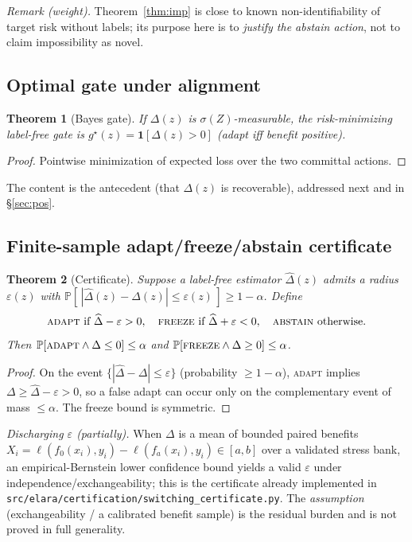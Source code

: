 \documentclass[11pt]{article}
\theoremstyle{plain}
\newtheorem{theorem}{Theorem}
\theoremstyle{definition}
\renewcommand{\Pr}{\mathbb{P}}
\begin{document}
\noindent\emph{Remark (weight).} Theorem~\ref{thm:imp} is close to known
non-identifiability of target risk without labels; its purpose here is to
\emph{justify the abstain action}, not to claim impossibility as novel.

\subsection{Optimal gate under alignment}
\begin{theorem}[Bayes gate]\label{thm:gate}
If $\Delta(z)$ is $\sigma(Z)$-measurable, the risk-minimizing label-free gate is
$g^\star(z)=\mathbf 1[\Delta(z)>0]$ (adapt iff benefit positive).
\end{theorem}
\begin{proof}
Pointwise minimization of expected loss over the two committal actions. \qedhere
\end{proof}
\noindent The content is the antecedent (that $\Delta(z)$ is recoverable), addressed
next and in \S\ref{sec:pos}.

\subsection{Finite-sample adapt/freeze/abstain certificate}\label{sec:cert}
\begin{theorem}[Certificate]\label{thm:cert}
Suppose a label-free estimator $\widehat\Delta(z)$ admits a radius $\varepsilon(z)$ with
$\Pr[\,|\widehat\Delta(z)-\Delta(z)|\le \varepsilon(z)\,]\ge 1-\alpha$. Define
\[
\textsc{adapt}\ \text{if}\ \widehat\Delta-\varepsilon>0,\quad
\textsc{freeze}\ \text{if}\ \widehat\Delta+\varepsilon<0,\quad
\textsc{abstain}\ \text{otherwise.}
\]
Then $\Pr[\textsc{adapt}\wedge \Delta\le 0]\le\alpha$ and
$\Pr[\textsc{freeze}\wedge \Delta\ge 0]\le\alpha$.
\end{theorem}
\begin{proof}
On the event $\{|\widehat\Delta-\Delta|\le\varepsilon\}$ (probability $\ge1-\alpha$),
\textsc{adapt} implies $\Delta\ge\widehat\Delta-\varepsilon>0$, so a false adapt can
occur only on the complementary event of mass $\le\alpha$. The freeze bound is
symmetric. \qedhere
\end{proof}
\noindent\emph{Discharging $\varepsilon$ (partially).} When $\Delta$ is a mean of
bounded paired benefits $X_i=\ell(f_0(x_i),y_i)-\ell(f_a(x_i),y_i)\in[a,b]$ over a
validated stress bank, an empirical-Bernstein lower confidence bound yields a valid
$\varepsilon$ under independence/exchangeability; this is the certificate already
implemented in \texttt{src/elara/certification/switching\_certificate.py}. The
\emph{assumption} (exchangeability / a calibrated benefit sample) is the residual
burden and is not proved in full generality.
\end{document}
